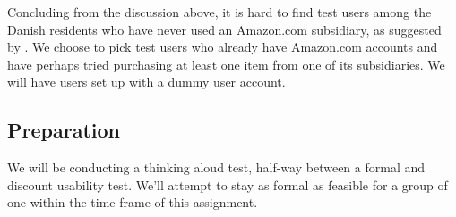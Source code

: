 Concluding from the discussion above, it is hard to find test users among the
Danish residents who have never used an Amazon.com subsidiary, as suggested by
\cite{molich}. We choose to pick test users who already have Amazon.com
accounts and have perhaps tried purchasing at least one item from one of its
subsidiaries. We will have users set up with a dummy user account.

















\subsection{Preparation}

We will be conducting a thinking aloud test, half-way between a formal and
discount usability test. We'll attempt to stay as formal as feasible for a
group of one within the time frame of this assignment.

